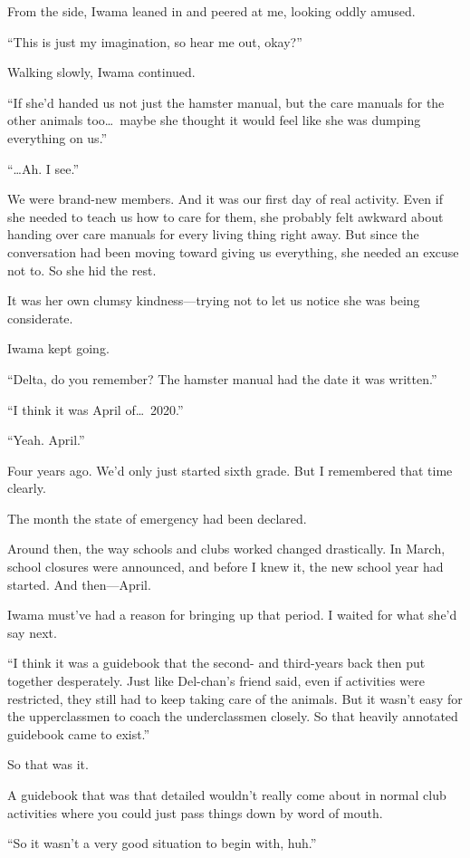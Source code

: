 \documentclass[
    a4paper,
    12pt,
    twoside,
    openany,
    UTF8,
    fontset=windows
]{ctexbook}
\begin{document}
From the side, Iwama leaned in and peered at me, looking oddly amused.

``This is just my imagination, so hear me out, okay?''

Walking slowly, Iwama continued.

``If she'd handed us not just the hamster manual, but the care manuals for the other animals too\dots\ maybe she thought it would feel like she was dumping everything on us.''

``\dots Ah. I see.''

We were brand-new members. And it was our first day of real activity. Even if she needed to teach us how to care for them, she probably felt awkward about handing over care manuals for every living thing right away. But since the conversation had been moving toward giving us everything, she needed an excuse not to. So she hid the rest.

It was her own clumsy kindness---trying not to let us notice she was being considerate.

Iwama kept going.

``Delta, do you remember? The hamster manual had the date it was written.''

``I think it was April of\dots\ 2020.''

``Yeah. April.''

Four years ago. We'd only just started sixth grade. But I remembered that time clearly.

The month the state of emergency had been declared.

Around then, the way schools and clubs worked changed drastically. In March, school closures were announced, and before I knew it, the new school year had started. And then---April.

Iwama must've had a reason for bringing up that period. I waited for what she'd say next.

``I think it was a guidebook that the second- and third-years back then put together desperately. Just like Del-chan's friend said, even if activities were restricted, they still had to keep taking care of the animals. But it wasn't easy for the upperclassmen to coach the underclassmen closely. So that heavily annotated guidebook came to exist.''

So that was it.

A guidebook that was that detailed wouldn't really come about in normal club activities where you could just pass things down by word of mouth.

``So it wasn't a very good situation to begin with, huh.''
\end{document}
